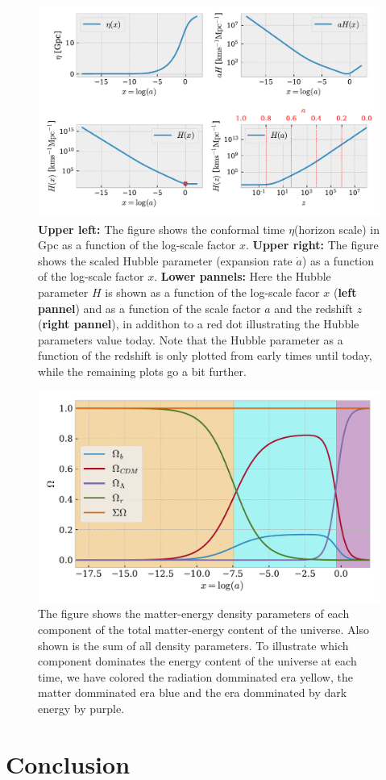\documentclass[twocolumn]{aastex62}
\begin{document}
\begin{figure}
    \includegraphics[scale=1]{Figures/Eta_&_H_of_x.pdf}
    \caption{\textbf{Upper left:} The figure shows the conformal time $\eta$(horizon scale) in Gpc as a function of the log-scale factor $x$. \textbf{Upper right:} The figure shows the scaled Hubble parameter (expansion rate $\dot{a}$) as a function of the log-scale factor $x$. \textbf{Lower pannels:} Here the Hubble parameter $H$ is shown as a function of the log-scale facor $x$ (\textbf{left pannel}) and as a function of the scale factor $a$ and the redshift $z$ (\textbf{right pannel}), in addithon to a red dot illustrating the Hubble parameters value today. Note that the Hubble parameter as a function of the redshift is only plotted from early times until today, while the remaining plots go a bit further.}
    \label{fig:Eta}
\end{figure}



\begin{figure}
    \includegraphics[scale=1]{Figures/Omegas_of_x.pdf}
    \caption{The figure shows the matter-energy density parameters of each component of the total matter-energy content of the universe. Also shown is the sum of all density parameters. To illustrate which component dominates the energy content of the universe at each time, we have colored the radiation domminated era yellow, the matter domminated era blue and the era domminated by dark energy by purple.}
    \label{fig:Omegas}
\end{figure}

\section{Conclusion} \label{sec:Conclusion}



\end{document}
